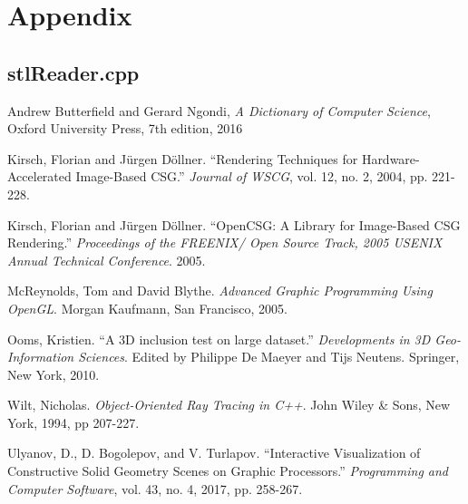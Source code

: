\documentclass[12pt]{article}
\begin{document}
\section{Appendix}
\subsection{stlReader.cpp}

\newpage
\begin{thebibliography}{10}
  Andrew Butterfield and Gerard Ngondi,
  \textit{A Dictionary of Computer Science},
  Oxford University Press,
  7th edition,
  2016

  Kirsch, Florian and J\"{u}rgen D\"{o}llner. ``Rendering Techniques for Hardware-Accelerated Image-Based CSG.'' {\it Journal of WSCG}, vol. 12, no. 2, 2004, pp. 221-228.

  Kirsch, Florian and J\"{u}rgen D\"{o}llner. ``OpenCSG: A Library for Image-Based CSG Rendering.'' {\it Proceedings of the FREENIX/ Open Source Track, 2005 USENIX Annual Technical Conference}. 2005.

  McReynolds, Tom and David Blythe. {\it Advanced Graphic Programming Using OpenGL}. Morgan Kaufmann, San Francisco, 2005.

  Ooms, Kristien. ``A 3D inclusion test on large dataset.'' {\it Developments in 3D Geo-Information Sciences}. Edited by Philippe De Maeyer and Tijs Neutens. Springer, New York, 2010.

  Wilt, Nicholas. {\it Object-Oriented Ray Tracing in C++}. John Wiley \& Sons, New York, 1994, pp 207-227.

  Ulyanov, D., D. Bogolepov, and V. Turlapov. ``Interactive Visualization of Constructive Solid Geometry Scenes on Graphic Processors.'' {\it Programming and Computer Software}, vol. 43, no. 4, 2017, pp. 258-267.
\end{thebibliography}
\end{document}
